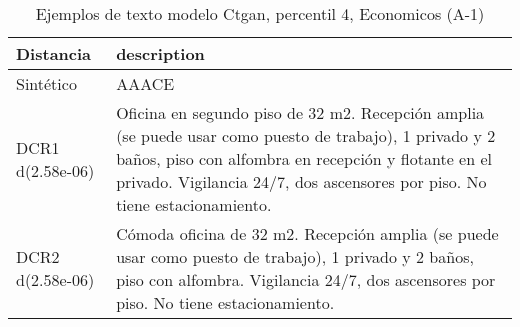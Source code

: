\begin{table}[H]
\centering
\fontsize{10}{14}\selectfont
\caption{Ejemplos de texto modelo Ctgan, percentil 4, Economicos (A-1)}
\label{table-example-economicos-a-1-ctgan-4p-text}
\begin{tabular}{|l|m{35em}|}
\hline
\rowcolor[gray]{0.8}
Distancia & description \\
\hline Sintético & AAACE \\
\hline DCR1 d(2.58e-06) & Oficina en segundo piso de 32 m2. Recepci\'on amplia (se puede usar como puesto de trabajo), 1 privado y 2 ba\~nos, piso con alfombra en recepci\'on y flotante en el privado. Vigilancia 24/7, dos ascensores por piso. No tiene estacionamiento. \\
\hline DCR2 d(2.58e-06) & C\'omoda oficina de 32 m2. Recepci\'on amplia (se puede usar como puesto de trabajo), 1 privado y 2 ba\~nos, piso con alfombra. Vigilancia 24/7, dos ascensores por piso. No tiene estacionamiento. \\
\hline
\end{tabular}
\end{table}
